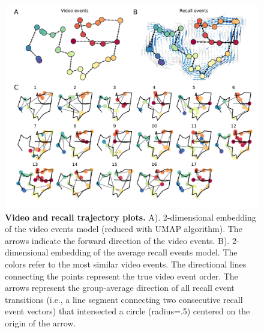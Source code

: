 \documentclass{article}
\begin{document}
\begin{figure}[t!]
\centering
\includegraphics[width=1\textwidth]{figs/3_trajectory.pdf}
\caption{\small \textbf{Video and recall trajectory plots.} A). 2-dimensional embedding of the video events model (reduced with UMAP algorithm). The arrows indicate the forward direction of the video events. B). 2-dimensional embedding of the average recall events model.  The colors refer to the most similar video events. The directional lines connecting the points represent the true video event order. The arrows represent the group-average direction of all recall event transitions (i.e., a line segment connecting two consecutive recall event vectors) that intersected a circle (radius=.5) centered on the origin of the arrow.}
\label{fig:trajectory}
\end{figure}
\end{document}
